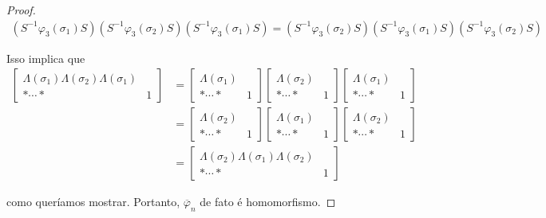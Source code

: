 \documentclass[a4paper,portuguese,11pt,twoside, leqno]{book}
\theoremstyle{definition}
\begin{document}
\begin{proof}
		\begin{align*}
		(S^{-1}\varphi_3(\sigma_1)S)(S^{-1}\varphi_3(\sigma_2)S)(S^{-1}\varphi_3(\sigma_1)S) = (S^{-1}\varphi_3(\sigma_2)S)(S^{-1}\varphi_3(\sigma_1)S)(S^{-1}\varphi_3(\sigma_2)S)
		\end{align*}
		\par\vspace{0.3cm} Isso implica que 
		\begin{align*}
		\left[\begin{array}{c|c}
		\Lambda(\sigma_1)\Lambda(\sigma_2)\Lambda(\sigma_1) & \\
		\hline 
		\ast\cdots\ast & 1
		\end{array}\right] &= \left[\begin{array}{c|c}
		\Lambda(\sigma_1) & \\
		\hline
		\ast\cdots\ast & 1
		\end{array}\right]\left[\begin{array}{c|c}
		\Lambda(\sigma_2) & \\
		\hline
		\ast\cdots\ast & 1
		\end{array}\right]\left[\begin{array}{c|c}
		\Lambda(\sigma_1) & \\
		\hline
		\ast\cdots\ast & 1
		\end{array}\right] \\ 
		&= \left[\begin{array}{c|c}
		\Lambda(\sigma_2) & \\
		\hline
		\ast\cdots\ast & 1
		\end{array}\right]\left[\begin{array}{c|c}
		\Lambda(\sigma_1) & \\
		\hline
		\ast\cdots\ast & 1
		\end{array}\right]\left[\begin{array}{c|c}
		\Lambda(\sigma_2) & \\
		\hline
		\ast\cdots\ast & 1
		\end{array}\right] \\
		&= \left[\begin{array}{c|c}
		\Lambda(\sigma_2)\Lambda(\sigma_1)\Lambda(\sigma_2) & \\
		\hline
		\ast\cdots\ast & 1
		\end{array}\right]
		\end{align*}
		\par\vspace{0.3cm} como queríamos mostrar. Portanto, $\overline{\varphi}_n$ de fato é homomorfismo.
	\end{proof}
\end{document}
